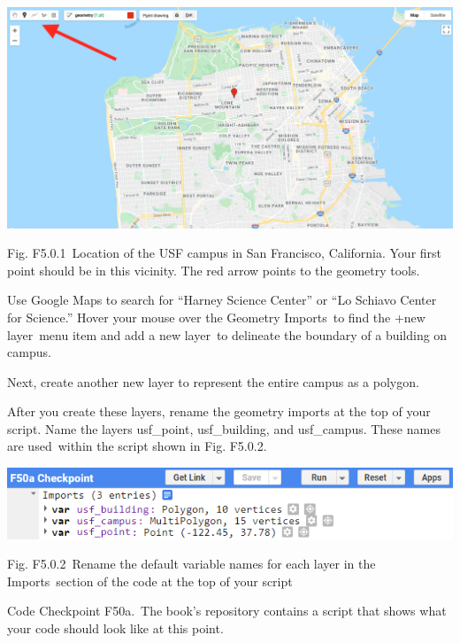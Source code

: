 \documentclass[
  letterpaper,
  DIV=11,
  numbers=noendperiod]{scrreprt}
\begin{document}
\includegraphics{./F5/image54.png}

Fig. F5.0.1~Location of the USF campus in San Francisco, California.
Your first point should be in this vicinity. The red arrow points to the
geometry tools.

Use Google Maps to search for ``Harney Science Center'' or ``Lo Schiavo
Center for Science.'' Hover your mouse over the Geometry Imports~to find
the +new layer~menu item and add a new layer~to delineate the boundary
of a building on campus.

Next, create another new layer to represent the entire campus as a
polygon.

After you create these layers, rename the geometry imports at the top of
your script. Name the layers usf\_point, usf\_building, and usf\_campus.
These names are used~within the script shown in Fig. F5.0.2.

\includegraphics{./F5/image10.png}

Fig. F5.0.2~Rename the default variable names for each layer in the
Imports~section of the code at the top of your script

\begin{tcolorbox}[enhanced jigsaw, left=2mm, breakable, rightrule=.15mm, opacityback=0, colframe=quarto-callout-note-color-frame, colbacktitle=quarto-callout-note-color!10!white, arc=.35mm, opacitybacktitle=0.6, toptitle=1mm, colback=white, leftrule=.75mm, title=\textcolor{quarto-callout-note-color}{\faInfo}\hspace{0.5em}{Note}, toprule=.15mm, bottomtitle=1mm, titlerule=0mm, bottomrule=.15mm, coltitle=black]

Code Checkpoint F50a.~The book's repository contains a script that shows
what your code should look like at this point.~

\end{tcolorbox}
\end{document}
